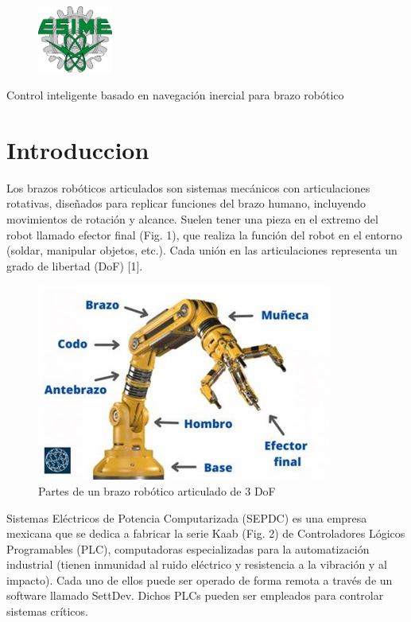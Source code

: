 \documentclass[12pt]{report}
\begin{document}
\begin{figure}[b]
\includegraphics[width=0.22\textwidth]{esime.png}
\end{figure} 

\begin{Huge}
	Control inteligente basado en navegación inercial para brazo robótico
\end{Huge}

\newpage

\tableofcontents

\newpage
\section*{Introduccion}

Los brazos robóticos articulados son sistemas mecánicos con articulaciones rotativas, diseñados para replicar funciones del brazo humano, incluyendo movimientos de rotación y alcance. Suelen tener una pieza en el extremo del robot llamado efector final (Fig. 1), que realiza la función del robot en el entorno (soldar, manipular objetos, etc.). Cada unión en las articulaciones representa un grado de libertad (DoF) [1].

\begin{figure}[htb]
	\centering
	\includegraphics[scale=0.6]{brazo.jpg}
	\caption{Partes de un brazo robótico articulado de 3 DoF}
\end{figure}

Sistemas Eléctricos de Potencia Computarizada (SEPDC) es una empresa mexicana que se dedica a fabricar la serie Kaab (Fig. 2) de Controladores Lógicos Programables (PLC), computadoras especializadas para la automatización industrial (tienen inmunidad al ruido eléctrico y resistencia a la vibración y al impacto). Cada uno de ellos puede ser operado de forma remota a través de un software llamado SettDev. Dichos PLCs pueden ser empleados para controlar sistemas críticos.
\end{document}
